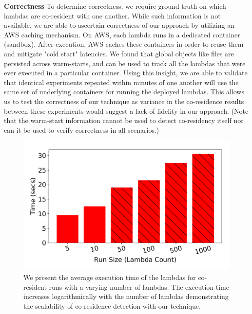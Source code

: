 \textbf{Correctness} 
To determine correctness, we require ground truth on which lambdas are
co-resident with one another. While such information is not available, we are
able to ascertain correctness of our approach by utilizing an AWS caching
mechanism. On AWS, each lambda runs in a dedicated container (sandbox).  After
execution, AWS caches these containers in order to reuse
them~\cite{awscontainerreuse} and mitigate "cold start" latencies. 
We found that global objects like files are persisted across warm-starts,
and can be used to track all the lambdas that were
ever executed in a particular container. Using this insight, we are able to 
validate that
identical experiments repeated within minutes of one another will use the same
set of underlying containers for running the deployed lambdas. This allows us 
to test the correctness of our technique as variance in the co-residence 
results between these experiments would suggest a lack of fidelity in our approach. 
(Note that the warm-start information cannot be used to detect co-residency itself 
nor can it be used to verify correctness in all scenarios.)


\begin{figure}[!t]
  \includegraphics[width=.99\linewidth]{fig/runtimes.pdf}
  \caption{We present the average execution time of the lambdas for co-resident
  runs with a varying number of lambdas. The execution time increases
  logarithmically with the number of lambdas demonstrating the scalability of
  co-residence detection with our technique.
\label{fig:runtimes}}
\end{figure}


